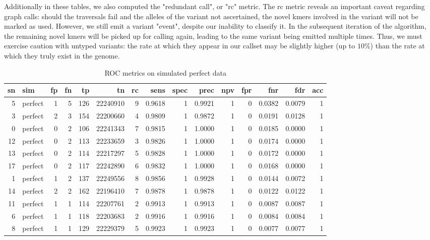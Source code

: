 Additionally in these tables, we also computed the "redundant call", or "rc" metric.  The rc metric reveals an important caveat regarding graph calls: should the traversals fail and the alleles of the variant not ascertained, the novel kmers involved in the variant will not be marked as used.  However, we still emit a variant "event", despite our inability to classify it.  In the subsequent iteration of the algorithm, the remaining novel kmers will be picked up for calling again, leading to the same variant being emitted multiple times.  Thus, we must exercise caution with untyped variants: the rate at which they appear in our callset may be slightly higher (up to $10\%$) than the rate at which they truly exist in the genome.

\begin{sidewaystable}[]
\centering
\caption{ROC metrics on simulated perfect data}
\label{tbl:roc_perfect}
\begin{tabular}{rlrrrrrrrrrrrrr}
\toprule
sn & sim & fp & fn & tp & tn & rc & sens & spec & prec & npv & fpr & fnr & fdr & acc\\
\midrule
5 & perfect & 1 & 5 & 126 & 22240910 & 9 & 0.9618 & 1 & 0.9921 & 1 & 0 & 0.0382 & 0.0079 & 1\\
3 & perfect & 2 & 3 & 154 & 22200660 & 4 & 0.9809 & 1 & 0.9872 & 1 & 0 & 0.0191 & 0.0128 & 1\\
0 & perfect & 0 & 2 & 106 & 22241343 & 7 & 0.9815 & 1 & 1.0000 & 1 & 0 & 0.0185 & 0.0000 & 1\\
12 & perfect & 0 & 2 & 113 & 22233659 & 3 & 0.9826 & 1 & 1.0000 & 1 & 0 & 0.0174 & 0.0000 & 1\\
13 & perfect & 0 & 2 & 114 & 22217297 & 5 & 0.9828 & 1 & 1.0000 & 1 & 0 & 0.0172 & 0.0000 & 1\\
17 & perfect & 0 & 2 & 117 & 22242890 & 6 & 0.9832 & 1 & 1.0000 & 1 & 0 & 0.0168 & 0.0000 & 1\\
1 & perfect & 1 & 2 & 137 & 22249556 & 8 & 0.9856 & 1 & 0.9928 & 1 & 0 & 0.0144 & 0.0072 & 1\\
14 & perfect & 2 & 2 & 162 & 22196410 & 7 & 0.9878 & 1 & 0.9878 & 1 & 0 & 0.0122 & 0.0122 & 1\\
11 & perfect & 1 & 1 & 114 & 22207761 & 2 & 0.9913 & 1 & 0.9913 & 1 & 0 & 0.0087 & 0.0087 & 1\\
6 & perfect & 1 & 1 & 118 & 22203683 & 2 & 0.9916 & 1 & 0.9916 & 1 & 0 & 0.0084 & 0.0084 & 1\\
8 & perfect & 1 & 1 & 129 & 22229379 & 5 & 0.9923 & 1 & 0.9923 & 1 & 0 & 0.0077 & 0.0077 & 1\\

\end{tabular}
\end{sidewaystable}
